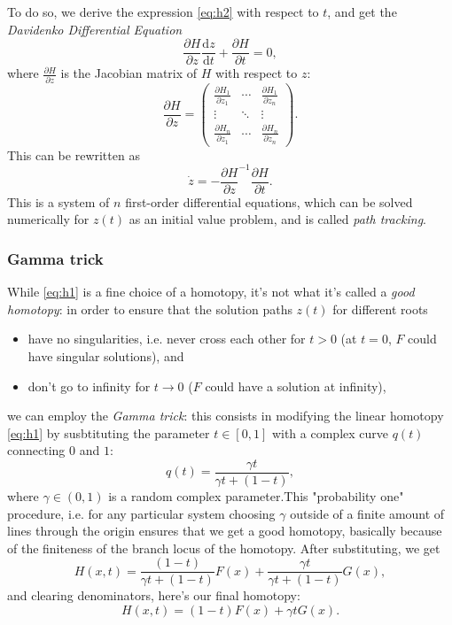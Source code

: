 \documentclass[a4paper]{article}
\theoremstyle{definition}
\theoremstyle{definition}
\theoremstyle{remark}
\theoremstyle{definition}
\begin{document}
To do so, we derive the expression \eqref{eq:h2} with respect to $t$, and get the \textit{Davidenko Differential Equation}
$$ \frac{\partial H}{\partial z}\frac{\mathrm{d} z}{\mathrm{d} t}+\frac{\partial H}{\partial t}=0 ,$$
where $\frac{\partial H}{\partial z}$ is the Jacobian matrix of $H$ with respect to $z$:
$$
\frac{\partial H}{\partial z}=
\begin{pmatrix}
    \frac{\partial H_1}{\partial z_1} & \cdots & \frac{\partial H_1}{\partial z_n}\\
    \vdots & \ddots & \vdots\\
    \frac{\partial H_n}{\partial z_1} & \cdots & \frac{\partial H_n}{\partial z_n}
\end{pmatrix} .
$$
This can be rewritten as
\begin{equation}\label{eq:dav} \dot{z}=-\frac{\partial H}{\partial z}^{-1}\frac{\partial H}{\partial t} .\end{equation}
This is a system of $n$ first-order differential equations, which can be solved numerically for $z(t)$ as an initial value problem, and is called \textit{path tracking}.
\subsubsection{Gamma trick}
While \eqref{eq:h1} is a fine choice of a homotopy, it's not what it's called a \textit{good homotopy}: in order to ensure that the solution paths $z(t)$ for different roots
\begin{itemize}
    \item have no singularities, i.e. never cross each other for $t>0$ (at $t=0$, $F$ could have singular solutions), and
    \item don't go to infinity for $t\to 0$ ($F$ could have a solution at infinity),
\end{itemize}
we can employ the \textit{Gamma trick}: this consists in modifying the linear homotopy
\eqref{eq:h1} by susbtituting the parameter $t\in[0,1]$ with a complex curve $q(t)$ connecting $0$ and $1$:
$$ q(t)=\frac{\gamma t}{\gamma t+(1-t)} ,$$
where $\gamma\in(0,1)$ is a random complex parameter.This "probability one" procedure, i.e. for any particular system choosing $\gamma$ outside of a finite amount of lines through
the origin ensures that we get a good homotopy, basically because of the finiteness of the branch locus of the homotopy.
After substituting, we get
$$ H(x,t)=\frac{(1-t)}{\gamma t+(1-t)}F(x)+\frac{\gamma t}{\gamma t+(1-t)}G(x) ,$$
and clearing denominators, here's our final homotopy:
\begin{equation}\label{eq:h3} H(x,t)=(1-t)F(x)+\gamma tG(x) .\end{equation}
\end{document}
